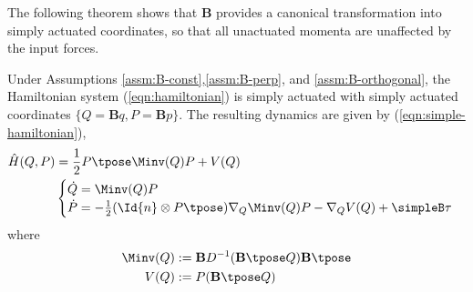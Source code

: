 The following theorem shows that \(\mathbf{B}\) provides a canonical
transformation into simply actuated coordinates, so that all unactuated momenta
are unaffected by the input forces.

\begin{thm}\label{thm:simply-actuated}
    Under Assumptions \ref{assm:B-const},\ref{assm:B-perp}, and
    \ref{assm:B-orthogonal}, the Hamiltonian system (\ref{eqn:hamiltonian}) is
    simply actuated with simply actuated coordinates 
    \(\{Q = \mathbf{B}q, P = \mathbf{B}p\}\). The resulting dynamics are 
    given by (\ref{eqn:simple-hamiltonian}),
    \begin{align}\label{eqn:simple-hamiltonian}
        \hat{H}(Q,P) &= 
        \frac{1}{2} P\tpose \Minv(Q) P + V(Q) \\
       &\begin{cases}
            \dot{Q} = \Minv(Q)P \\
            \dot{P} = -\frac{1}{2} (\Id{n} \otimes P\tpose) \nabla_Q \Minv(Q) P
                - \nabla_Q V(Q) + \simpleB \tau
        \end{cases} \nonumber
    \end{align}
    where
    \begin{align*}
        \Minv(Q) &:= \mathbf{B}D^{-1}(\mathbf{B}\tpose Q)\mathbf{B}\tpose \\
        V(Q) &:= P(\mathbf{B}\tpose Q) \\
    \end{align*}
\end{thm}

